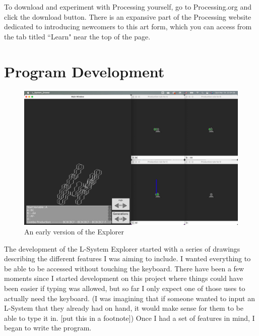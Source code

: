 \documentclass[12pt,twoside]{reedthesis}
\begin{document}
	To download and experiment with Processing yourself, go to Processing.org and click the download button. There is an expansive part of the Processing website dedicated to introducing newcomers to this art form, which you can access from the tab titled ``Learn" near the top of the page.


\section{Program Development}

		
	\begin{figure}[h]
	\centering
	\includegraphics[scale=0.3, frame]{Images/EarlyExplorer}
	\caption{An early version of the Explorer}
	\label {EarlyExplorer}
	\end{figure}

	The development of the L-System Explorer started with a series of drawings describing the different features I was aiming to include. I wanted everything to be able to be accessed without touching the keyboard. There have been a few moments since I started development on this project where things could have been easier if typing was allowed, but so far I only expect one of those uses to actually need the keyboard. (I was imagining that if someone wanted to input an L-System that they already had on hand, it would make sense for them to be able to type it in. [put this in a footnote]) Once I had a set of features in mind, I began to write the program.
	
\end{document}

